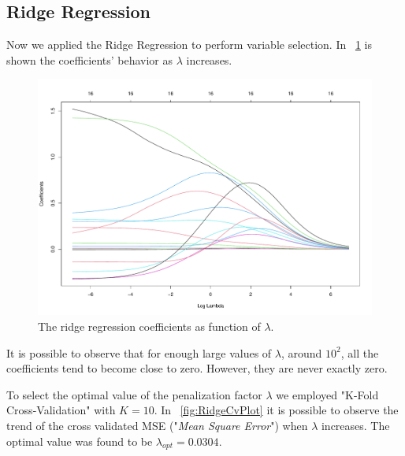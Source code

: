 \subsection{Ridge Regression}

Now we applied the Ridge Regression to perform variable selection. In \Fig~\ref{fig:RidgeCoefVsLambda} is shown the coefficients' behavior as $\lambda$ increases. 

\begin{figure}[h]
	\centering
	\includegraphics[width=0.4\linewidth]{ImageFiles/Regression/Ridge/RidgeCoefVsLambda}
	\caption{The ridge regression coefficients as function of $\lambda$.}
	\label{fig:RidgeCoefVsLambda}
\end{figure}

It is possible to observe that for enough large values of $\lambda$, around $10^2$, all the coefficients tend to become close to zero. However, they are never exactly zero.

To select the optimal value of the penalization factor $\lambda$ we employed "K-Fold Cross-Validation" with $K=10$. In \Fig~\ref{fig:RidgeCvPlot} it is possible to observe the trend of the cross validated MSE ("\textit{Mean Square Error}") when $\lambda$ increases. The optimal value was found to be $\lambda_{opt} = 0.0304$.


